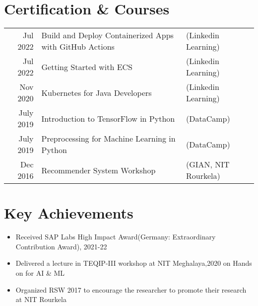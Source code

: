 \documentclass[a4paper,12pt]{article}
\begin{document}
\section{Certification \& Courses}
\begin{tabular}{rll}
 Jul 2022  & Build and Deploy Containerized Apps with GitHub Actions & (Linkedin Learning)\\
 Jul 2022  & Getting Started with ECS & (Linkedin Learning)\\
 Nov 2020  & Kubernetes for Java Developers & (Linkedin Learning)\\
 July 2019 & Introduction to TensorFlow in Python & (DataCamp)\\
 July 2019 & Preprocessing for Machine Learning in Python & (DataCamp)\\
 Dec 2016  & Recommender System Workshop & (GIAN, NIT Rourkela)
\end{tabular}

\section{Key Achievements}
  \begin{itemize}[nosep,after=\strut, leftmargin=1em, itemsep=3pt]
    \item Received SAP Labs High Impact Award(Germany: Extraordinary Contribution Award), 2021-22
    \item Delivered a lecture in TEQIP-III workshop at NIT Meghalaya,2020 on Hands on for AI \& ML 
    \item Organized RSW 2017 to encourage the researcher to promote their research at NIT Rourkela
  \end{itemize}

\vfill
\end{document}
